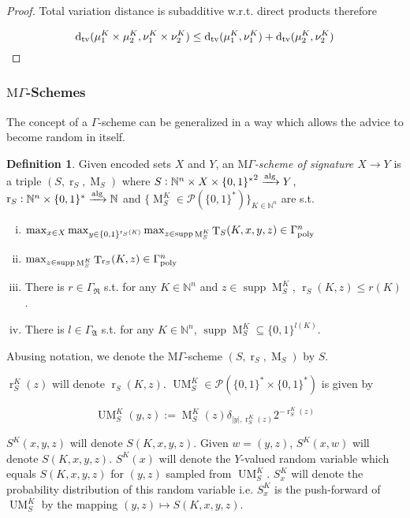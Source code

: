 \documentclass{article}
\numberwithin{equation}{section}
\theoremstyle{definition}
\newtheorem{definition}{Definition}[section]
\theoremstyle{plain}
\newcommand{\Bool}{\{0,1\}}
\newcommand{\Words}{{\Bool^*}}
\newcommand{\WordsLen}[1]{{\Bool^{#1}}}
\DeclareMathOperator{\Supp}{supp}
\DeclareMathOperator{\T}{T}
\DeclareMathOperator{\R}{r}
\DeclareMathOperator{\M}{M}
\DeclareMathOperator{\UM}{UM}
\newcommand{\Dtv}{\operatorname{d}_{\textnormal{tv}}}
\newcommand{\Nats}{\mathbb{N}}
\newcommand{\Abs}[1]{\lvert #1 \rvert}
\newcommand{\GrowR}{\Gamma_{\mathfrak{R}}}
\newcommand{\GrowA}{\Gamma_{\mathfrak{A}}}
\newcommand{\MGrow}{\mathrm{M}\Gamma}
\newcommand{\BoolR}[1]{\Bool^{\R_{#1}(K)}}
\newcommand{\GammaPoly}{\Gamma_{\textnormal{poly}}}
\newcommand{\Alg}{\xrightarrow{\textnormal{alg}}}
\begin{document}
\begin{proof}

Total variation distance is subadditive w.r.t. direct products therefore 

\[\Dtv(\mu_1^K \times \mu_2^K, \nu_1^K \times \nu_2^K) \leq \Dtv(\mu_1^K, \nu_1^K) + \Dtv(\mu_2^K, \nu_2^K)\]
\end{proof}

\subsubsection{\texorpdfstring{$\MGrow$}{MΓ}-Schemes}

The concept of a $\Gamma$-scheme can be generalized in a way which allows the advice to become random in itself.

\begin{samepage}
\begin{definition}

Given encoded sets $X$ and $Y$, an \emph{$\MGrow$-scheme of signature ${X \rightarrow Y}$} is a triple $(S,\R_S,\M_S)$ where $S: \Nats^n \times X \times \Words^2 \Alg Y$, ${\R_S: \Nats^n \times \Words \Alg \Nats}$ and $\{\M_S^K \in \mathcal{P}(\Words)\}_{K \in \Nats^n}$ are s.t.

\begin{enumerate}[(i)]

\item $\max_{x \in X} \max_{y \in \BoolR{S}} \max_{z \in \Supp \M_S^K} \T_S(K,x,y,z) \in \GammaPoly^n$

\item ${\max_{z \in \Supp \M_S^K} \T_{\R_S}(K,z) \in \GammaPoly^n}$

\item There is $r \in \GrowR$ s.t. for any $K \in \Nats^n$ and $z \in \Supp \M_S^K$, $\R_S(K,z) \leq r(K)$.

\item There is $l \in \GrowA$ s.t. for any $K \in \Nats^n$, $\Supp \M_S^K \subseteq \WordsLen{l(K)}$.

\end{enumerate}

Abusing notation, we denote the $\MGrow$-scheme $(S,\R_S,\M_S)$ by $S$.

$\R_S^K(z)$ will denote $\R_S(K,z)$. $\UM_S^K \in \mathcal{P}(\Words \times \Words)$ is given by 

\[\UM_S^K(y,z):= \M_S^K(z) \delta_{\Abs{y},\R_S^K(z)} 2^{-\R_S^K(z)}\]

$S^K(x,y,z)$ will denote $S(K,x,y,z)$. Given $w=(y,z)$, $S^K(x,w)$ will denote $S(K,x,y,z)$. $S^K(x)$ will denote the $Y$-valued random variable which equals $S(K,x,y,z)$ for $(y,z)$ sampled from $\UM_S^K$. $S_x^K$ will denote the probability distribution of this random variable i.e. $S_x^K$ is the push-forward of $\UM_S^K$ by the mapping $(y,z) \mapsto S(K,x,y,z)$.


\end{definition}
\end{samepage}
\end{document}
